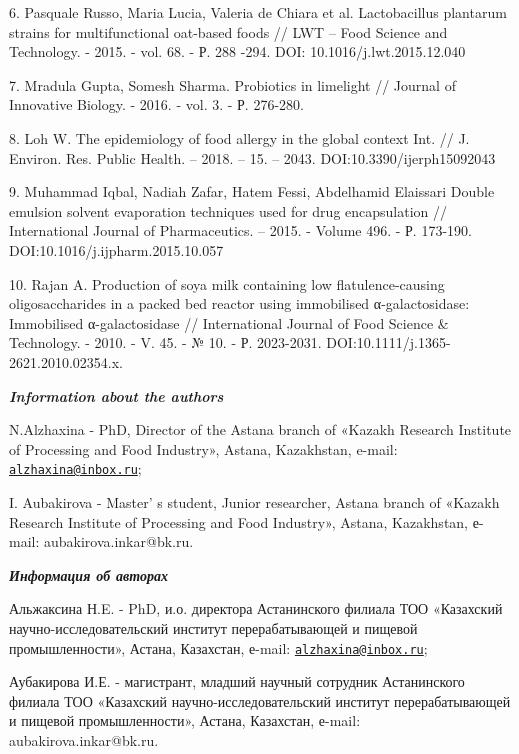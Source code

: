 6. Pasquale Russo, Maria Lucia, Valeria de Chiara et al. Lactobacillus
plantarum strains for multifunctional oat-based foods // LWT -- Food
Science and Technology. - 2015. - vol. 68. - Р. 288 -294. DOI:
10.1016/j.lwt.2015.12.040

7. Mradula Gupta, Somesh Sharma. Probiotics in limelight // Journal of
Innovative Biology. - 2016. - vol. 3. - Р. 276-280.

8. Loh W. The epidemiology of food allergy in the global context Int. //
J. Environ. Res. Public Health. -- 2018. -- 15. -- 2043.
DOI:10.3390/ijerph15092043

9. Muhammad Iqbal, Nadiah Zafar, Hatem Fessi, Abdelhamid Elaissari
Double emulsion solvent evaporation techniques used for drug
encapsulation // International Journal of Pharmaceutics. -- 2015. -
Volume 496. - Р. 173-190. DOI:10.1016/j.ijpharm.2015.10.057

10. Rajan A. Production of soya milk containing low flatulence-causing
oligosaccharides in a packed bed reactor using immobilised
α-galactosidase: Immobilised α-galactosidase // International Journal of
Food Science \& Technology. - 2010. - V. 45. - № 10. - Р. 2023-2031.
DOI:10.1111/j.1365- 2621.2010.02354.x.

\emph{{\bfseries Information about the authors}}

N.Alzhaxina - PhD, Director of the Astana branch of «Kazakh Research
Institute of Processing and Food Industry», Astana, Kazakhstan, e-mail:
\href{mailto:alzhaxina@inbox.ru}{\nolinkurl{alzhaxina@inbox.ru}};

I. Aubakirova - Master' s student, Junior researcher,
Astana branch of «Kazakh Research Institute of Processing and Food
Industry», Astana, Kazakhstan, е-mail: aubakirova.inkar@bk.ru.

\emph{{\bfseries Информация об авторах}}

Альжаксина Н.E. - PhD, и.о. директора Астанинского филиала ТОО
«Казахский научно-исследовательский институт перерабатывающей и пищевой
промышленности», Астана, Казахстан, е-mail:
\href{mailto:alzhaxina@inbox.ru}{\nolinkurl{alzhaxina@inbox.ru}};

Аубакирова И.Е. - магистрант, младший научный сотрудник Астанинского
филиала ТОО «Казахский научно-исследовательский институт
перерабатывающей и пищевой промышленности», Астана, Казахстан, е-mail:
aubakirova.inkar@bk.ru.